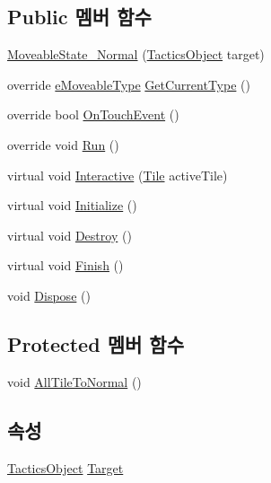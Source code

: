 \subsection*{Public 멤버 함수}
\begin{DoxyCompactItemize}
\item 
\hyperlink{class_move_decorator_1_1_moveable_state___normal_a05b09dff07f87e452a660049929804ea}{Moveable\+State\+\_\+\+Normal} (\hyperlink{class_tactics_object}{Tactics\+Object} target)
\item 
override \hyperlink{_move_decorator_8cs_a90215797ba850e199f3ef63d7c56f132}{e\+Moveable\+Type} \hyperlink{class_move_decorator_1_1_moveable_state___normal_accc4ab296d5b1c1cf0f465b9a2b5f2dd}{Get\+Current\+Type} ()
\item 
override bool \hyperlink{class_move_decorator_1_1_moveable_state___normal_a957e8d66d3d196316ba51794e633b7a0}{On\+Touch\+Event} ()
\item 
override void \hyperlink{class_move_decorator_1_1_moveable_state___normal_a9e4e591aa61c13840a15facffa2148d6}{Run} ()
\item 
virtual void \hyperlink{class_move_decorator_1_1_moveable_state_a1e66885aa7daf1021fc654b706b53ab8}{Interactive} (\hyperlink{class_tile}{Tile} active\+Tile)
\item 
virtual void \hyperlink{class_m_c_n_1_1_state_a5be59bc891e64cbbe4322d74a6746908}{Initialize} ()
\item 
virtual void \hyperlink{class_m_c_n_1_1_state_aebf48ef248bbf185d6aae91d9789459e}{Destroy} ()
\item 
virtual void \hyperlink{class_m_c_n_1_1_state_a2492ca731678b8216c02134dddeeb745}{Finish} ()
\item 
void \hyperlink{class_m_c_n_1_1_state_af6df0477e0dead784489688cb2c2093e}{Dispose} ()
\end{DoxyCompactItemize}
\subsection*{Protected 멤버 함수}
\begin{DoxyCompactItemize}
\item 
void \hyperlink{class_move_decorator_1_1_moveable_state_a2b63f058084f2548f8547c21715d271c}{All\+Tile\+To\+Normal} ()
\end{DoxyCompactItemize}
\subsection*{속성}
\begin{DoxyCompactItemize}
\item 
\hyperlink{class_tactics_object}{Tactics\+Object} \hyperlink{class_m_c_n_1_1_state_a79a563b32f183c9adc9a96679fc57eb8}{Target}
\end{DoxyCompactItemize}


